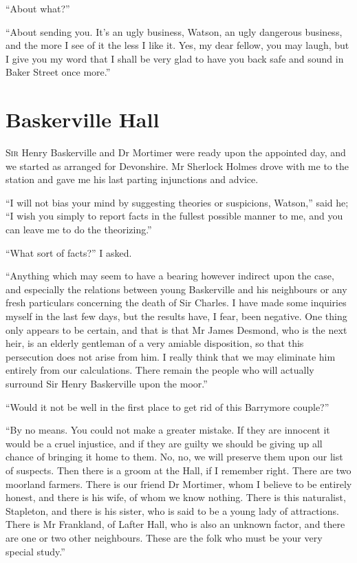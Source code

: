 \documentclass[paper=5.5in:8.5in,BCOR=7mm,twoside,DIV=calc,12pt,usegeometry,openany,chapterprefix,endperiod]{scrbook} %
\begin{document}
\enquote{About what?}

\enquote{About sending you. It's an ugly business, Watson, an ugly dangerous business, and the more I see of it the less I like it. Yes, my dear fellow, you may laugh, but I give you my word that I shall be very glad to have you back safe and sound in Baker Street once more.}

\chapter{Baskerville Hall}
\lettrine[lines=1]{S}{ir} Henry Baskerville and Dr Mortimer were ready upon the appointed day, and we started as arranged for Devonshire. Mr Sherlock Holmes drove with me to the station and gave me his last parting injunctions and advice.

\enquote{I will not bias your mind by suggesting theories or suspicions, Watson,} said he; \enquote{I wish you simply to report facts in the fullest possible manner to me, and you can leave me to do the theorizing.}

\enquote{What sort of facts?} I asked.

\enquote{Anything which may seem to have a bearing however indirect upon the case, and especially the relations between young Baskerville and his neighbours or any fresh particulars concerning the death of Sir Charles. I have made some inquiries myself in the last few days, but the results have, I fear, been negative. One thing only appears to be certain, and that is that Mr James Desmond, who is the next heir, is an elderly gentleman of a very amiable disposition, so that this persecution does not arise from him. I really think that we may eliminate him entirely from our calculations. There remain the people who will actually surround Sir Henry Baskerville upon the moor.}

\enquote{Would it not be well in the first place to get rid of this Barrymore couple?}

\enquote{By no means. You could not make a greater mistake. If they are innocent it would be a cruel injustice, and if they are guilty we should be giving up all chance of bringing it home to them. No, no, we will preserve them upon our list of suspects. Then there is a groom at the Hall, if I remember right. There are two moorland farmers. There is our friend Dr Mortimer, whom I believe to be entirely honest, and there is his wife, of whom we know nothing. There is this naturalist, Stapleton, and there is his sister, who is said to be a young lady of attractions. There is Mr Frankland, of Lafter Hall, who is also an unknown factor, and there are one or two other neighbours. These are the folk who must be your very special study.}
\end{document}
